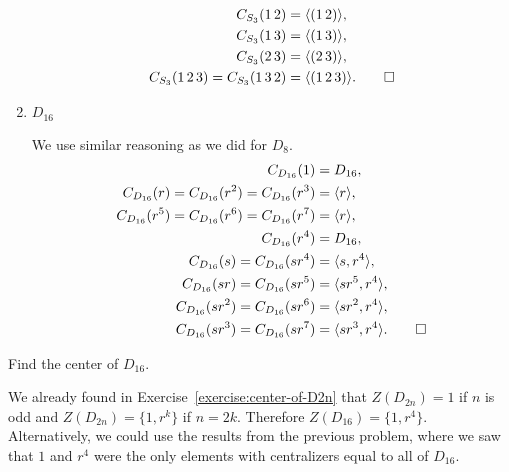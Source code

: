 \begin{enumerate}
\begin{solution}
\begin{align*}
      C_{S_3}(1\,2) &= \langle{(1\,2)}\rangle, \\
      C_{S_3}(1\,3) &= \langle{(1\,3)}\rangle, \\
      C_{S_3}(2\,3) &= \langle{(2\,3)}\rangle, \\
      C_{S_3}(1\,2\,3) = C_{S_3}(1\,3\,2) &= \langle{(1\,2\,3)}\rangle. \qedhere
    \end{align*}
  \end{solution}
\item $D_{16}$
  \begin{solution}
    We use similar reasoning as we did for $D_8$.
    \begin{align*}
      C_{D_{16}}(1) &= D_{16}, \\
      C_{D_{16}}(r) = C_{D_{16}}(r^2) = C_{D_{16}}(r^3) &= \langle{r}\rangle, \\
      C_{D_{16}}(r^5) = C_{D_{16}}(r^6) = C_{D_{16}}(r^7) &= \langle{r}\rangle, \\
      C_{D_{16}}(r^4) &= D_{16}, \\
      C_{D_{16}}(s) = C_{D_{16}}(sr^4) &= \langle{s, r^4}\rangle, \\
      C_{D_{16}}(sr) = C_{D_{16}}(sr^5) &= \langle{sr^5, r^4}\rangle, \\
      C_{D_{16}}(sr^2) = C_{D_{16}}(sr^6) &= \langle{sr^2, r^4}\rangle, \\
      C_{D_{16}}(sr^3) = C_{D_{16}}(sr^7) &= \langle{sr^3, r^4}\rangle. \qedhere
    \end{align*}
  \end{solution}
\end{enumerate}

 Find the center of $D_{16}$.
\begin{solution}
  We already found in Exercise~\ref{exercise:center-of-D2n} that
  $Z(D_{2n}) = 1$ if $n$ is odd and $Z(D_{2n}) = \{1, r^k\}$ if
  $n = 2k$. Therefore $Z(D_{16}) = \{1, r^4\}$. Alternatively, we
  could use the results from the previous problem, where we saw that
  $1$ and $r^4$ were the only elements with centralizers equal to all
  of $D_{16}$.
\end{solution}

